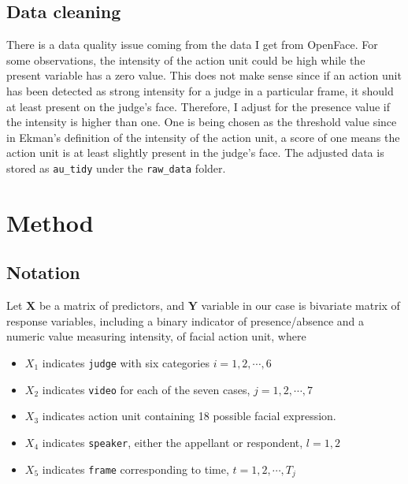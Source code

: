 \documentclass{monashthesis}
\begin{document}
\hypertarget{data-cleaning}{%
\section{Data cleaning}\label{data-cleaning}}

There is a data quality issue coming from the data I get from OpenFace. For some observations, the intensity of the action unit could be high while the present variable has a zero value. This does not make sense since if an action unit has been detected as strong intensity for a judge in a particular frame, it should at least present on the judge's face. Therefore, I adjust for the presence value if the intensity is higher than one. One is being chosen as the threshold value since in Ekman's definition of the intensity of the action unit, a score of one means the action unit is at least slightly present in the judge's face. The adjusted data is stored as \texttt{au\_tidy} under the \texttt{raw\_data} folder.

\hypertarget{method}{%
\chapter{Method}\label{method}}

\hypertarget{notation}{%
\section{Notation}\label{notation}}

Let \(\mathbf{X}\) be a matrix of predictors, and \(\mathbf{Y}\) variable in our case is bivariate matrix of response variables, including a binary indicator of presence/absence and a numeric value measuring intensity, of facial action unit, where

\begin{itemize}
\item
  \(X_1\) indicates \texttt{judge} with six categories \(i = 1,2, \cdots, 6\)
\item
  \(X_2\) indicates \texttt{video} for each of the seven cases, \(j = 1,2, \cdots, 7\)
\item
  \(X_3\) indicates action unit containing 18 possible facial expression.
\item
  \(X_4\) indicates \texttt{speaker}, either the appellant or respondent, \(l=1,2\)
\item
  \(X_5\) indicates \texttt{frame} corresponding to time, \(t = 1,2, \cdots, T_j\)
\end{itemize}
\end{document}
